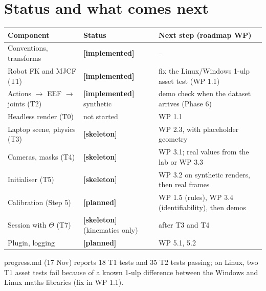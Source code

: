 \documentclass[11pt,a4paper]{article}
\newcommand{\done}{\textcolor{okgreen}{\textbf{[implemented]}}}
\newcommand{\skel}{\textcolor{skelamber}{\textbf{[skeleton]}}}
\newcommand{\planned}{\textcolor{plangray}{\textbf{[planned]}}}
\newcommand{\code}[1]{{\small\ttfamily\begingroup\def\_{\textunderscore\allowbreak}\def\/{/\allowbreak}#1\endgroup}}
\begin{document}
\section{Status and what comes next}\label{sec:status}
\begin{center}\small
\begin{tabularx}{\linewidth}{@{}>{\raggedright\arraybackslash}p{4.0cm}>{\raggedright\arraybackslash}p{2.9cm}>{\raggedright\arraybackslash}X@{}}
\toprule
\textbf{Component} & \textbf{Status} & \textbf{Next step (roadmap WP)}\\
\midrule
Conventions, transforms & \done & --\\
Robot FK and MJCF (T1) & \done & fix the Linux/Windows 1-ulp asset test (WP 1.1)\\
Actions $\to$ EEF $\to$ joints (T2) & \done{} synthetic & demo check when the dataset arrives (Phase 6)\\
Headless render (T0) & not started & WP 1.1\\
Laptop scene, physics (T3) & \skel & WP 2.3, with placeholder geometry\\
Cameras, masks (T4) & \skel & WP 3.1; real values from the lab or WP 3.3\\
Initialiser (T5) & \skel & WP 3.2 on synthetic renders, then real frames\\
Calibration (Step 5) & \planned & WP 1.5 (rules), WP 3.4 (identifiability), then demos\\
Session with $\Theta$ (T7) & \skel{} (kinematics only) & after T3 and T4\\
Plugin, logging & \planned & WP 5.1, 5.2\\
\bottomrule
\end{tabularx}
\end{center}
\code{progress.md} (17 Nov) reports 18 T1 tests and 35 T2 tests passing; on Linux, two T1 asset tests fail because of a known 1-ulp difference between the Windows and Linux maths libraries (fix in WP 1.1).

\appendix
\end{document}
